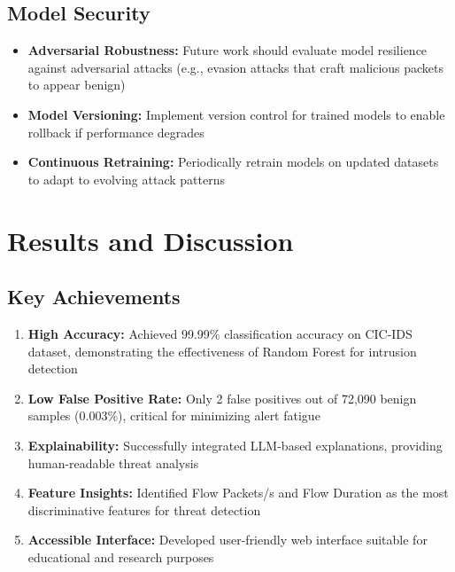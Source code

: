 \documentclass[12pt,a4paper]{article}
\begin{document}
\subsection{Model Security}

\begin{itemize}
    \item \textbf{Adversarial Robustness:} Future work should evaluate model resilience against adversarial attacks (e.g., evasion attacks that craft malicious packets to appear benign)
    \item \textbf{Model Versioning:} Implement version control for trained models to enable rollback if performance degrades
    \item \textbf{Continuous Retraining:} Periodically retrain models on updated datasets to adapt to evolving attack patterns
\end{itemize}

\section{Results and Discussion}

\subsection{Key Achievements}

\begin{enumerate}
    \item \textbf{High Accuracy:} Achieved 99.99\% classification accuracy on CIC-IDS dataset, demonstrating the effectiveness of Random Forest for intrusion detection
    
    \item \textbf{Low False Positive Rate:} Only 2 false positives out of 72,090 benign samples (0.003\%), critical for minimizing alert fatigue
    
    \item \textbf{Explainability:} Successfully integrated LLM-based explanations, providing human-readable threat analysis
    
    \item \textbf{Feature Insights:} Identified Flow Packets/s and Flow Duration as the most discriminative features for threat detection
    
    \item \textbf{Accessible Interface:} Developed user-friendly web interface suitable for educational and research purposes
\end{enumerate}
\end{document}
